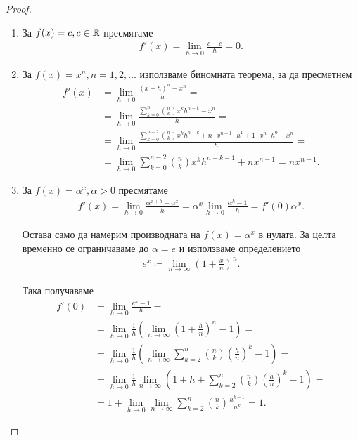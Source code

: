 \documentclass[numbers=endperiod, bibliography=totocnumbered]{scrartcl}
\begin{document}
\begin{proof}
  \mbox{}
  \begin{enumerate}
    \item За \( f(x) = c, c \in \mathbb{R} \) пресмятаме
    \begin{align*}
      f'(x) = \lim_{h \to 0} \frac {c - c} h = 0.
    \end{align*}

    \item За \( f(x) = x^n, n = 1, 2, \ldots \) използваме биномната теорема, за да пресметнем
    \begin{align*}
      f'(x)
      &=
      \lim_{h \to 0} \frac {{(x+h)}^n - x^n} h
      = \\ &=
      \lim_{h \to 0} \frac {\sum_{k=0}^n \binom{n}{k} x^k h^{n-k} - x^n} h
      = \\ &=
      \lim_{h \to 0} \frac {\sum_{k=0}^{n-2} \binom{n}{k} x^k h^{n-k} + n \cdot x^{n-1} \cdot h^1 + 1 \cdot x^n \cdot h^0 - x^n} h
      = \\ &=
      \lim_{h \to 0} \sum_{k=0}^{n-2} \binom{n}{k} x^k h^{n-k-1} + n x^{n-1}
      =
      n x^{n-1}.
    \end{align*}

    \item За \( f(x) = \alpha^x, \alpha > 0 \) пресмятаме
    \begin{align*}
      f'(x)
      =
      \lim_{h \to 0} \frac {\alpha^{x+h} - \alpha^x} h
      =
      \alpha^x \lim_{h \to 0} \frac {\alpha^h - 1} h
      =
      f'(0) \alpha^x.
    \end{align*}

    Остава само да намерим производната на \( f(x) = \alpha^x \) в нулата. За целта временно се ограничаваме до \( \alpha = e \) и използваме определението
    \begin{align*}
      e^x \coloneqq \lim_{n \to \infty} {\left( 1 + \frac x n \right)}^n.
    \end{align*}

    Така получаваме
    \begin{align*}
      f'(0)
      &=
      \lim_{h \to 0} \frac {e^h - 1} h
      = \\ &=
      \lim_{h \to 0} \frac 1 h \left( \lim_{n \to \infty} {\left( 1 + \frac h n \right)}^n - 1 \right)
      = \\ &=
      \lim_{h \to 0} \frac 1 h \left( \lim_{n \to \infty} \sum_{k=2}^n \binom{n}{k} {\left(\frac h n \right)}^k - 1 \right)
      = \\ &=
      \lim_{h \to 0} \frac 1 h \lim_{n \to \infty} \left( 1 + h + \sum_{k=2}^n \binom{n}{k} {\left(\frac h n \right)}^k - 1 \right)
      = \\ &=
      1 + \lim_{h \to 0} \lim_{n \to \infty} \sum_{k=2}^n \binom{n}{k} \frac {h^{k-1}} {n^k} = 1.
    \end{align*}


\end{enumerate}
\end{proof}
\end{document}
